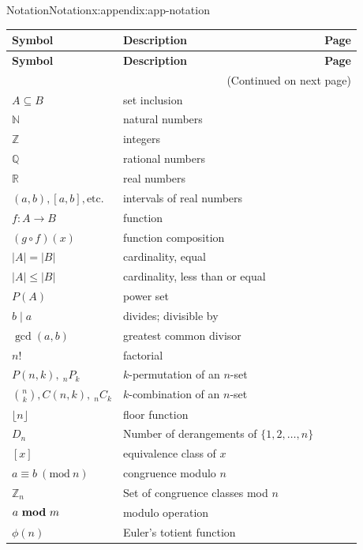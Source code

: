 \documentclass[oneside,10pt,]{book}
\numberwithin{equation}{section}
\newcommand{\Mod}[1]{\ \left(\mathrm{mod}\ #1\right)}
\begin{document}
\begin{appendixptx}{Notation}{}{Notation}{}{}{x:appendix:app-notation}
\begin{longtable}[l]{lp{}r}
\addtocounter{table}{-1}
\textbf{Symbol}&\textbf{Description}&\textbf{Page}\\[1em]
\endfirsthead
\textbf{Symbol}&\textbf{Description}&\textbf{Page}\\[1em]
\endhead
\multicolumn{3}{r}{(Continued on next page)}\\
\endfoot
\endlastfoot
\(A \subseteq B\)&set inclusion&\pageref{g:notation:id424083}\\
\(\mathbb{N}\)&natural numbers&\pageref{g:notation:id450080}\\
\(\mathbb{Z}\)&integers&\pageref{g:notation:id450066}\\
\(\mathbb{Q}\)&rational numbers&\pageref{g:notation:id450081}\\
\(\mathbb{R}\)&real numbers&\pageref{g:notation:id450111}\\
\((a,b), [a,b], \text{etc.}\)&intervals of real numbers&\pageref{g:notation:id450094}\\
\(f: A \rightarrow B\)&function&\pageref{g:notation:id450142}\\
\((g \circ f)(x)\)&function composition&\pageref{g:notation:id450282}\\
\(|A| = |B|\)&cardinality, equal&\pageref{g:notation:id450343}\\
\(|A| \leq |B|\)&cardinality, less than or equal&\pageref{g:notation:id450324}\\
\(P(A)\)&power set&\pageref{g:notation:id450421}\\
\(b \mid a\)&divides; divisible by&\pageref{g:notation:id450816}\\
\(\gcd(a,b)\)&greatest common divisor&\pageref{g:notation:id449019}\\
\(n!\)&factorial&\pageref{g:notation:id441865}\\
\(P(n,k),\ {}_nP_k\)&\(k\)-permutation of an \(n\)-set&\pageref{g:notation:id440227}\\
\(\binom{n}{k}, C(n,k),\ {}_nC_k\)&\(k\)-combination of an \(n\)-set&\pageref{g:notation:id417644}\\
\(\lfloor n \rfloor\)&floor function&\pageref{g:notation:id438305}\\
\(D_n\)&Number of derangements of \(\{1,2,\ldots,n\}\)&\pageref{g:notation:id435957}\\
\([x]\)&equivalence class of \(x\)&\pageref{g:notation:id444339}\\
\(a \equiv b \Mod{n}\)&congruence modulo \(n\)&\pageref{g:notation:id444838}\\
\(\mathbb{Z}_n\)&Set of congruence classes mod \(n\)&\pageref{g:notation:id444993}\\
\(a \ \mathrm{\bf mod} \ m\)&modulo operation&\pageref{g:notation:id445197}\\
\(\phi(n)\)&Euler's totient function&\pageref{g:notation:id221341}\\
\end{longtable}
\end{appendixptx}
\end{document}
